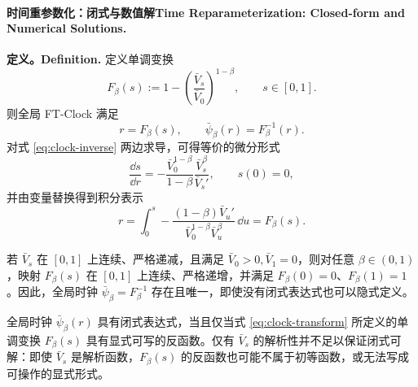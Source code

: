 \paragraph{\ifinternalcn 时间重参数化：闭式与数值解\else Time Reparameterization: Closed-form and Numerical Solutions\fi.}
\textbf{\ifinternalcn 定义。\else Definition.\fi}
定义单调变换
\begin{equation}
  F_{\beta}(s)
  :=
  1-\left(\frac{\bar{V}_s}{\bar{V}_0}\right)^{1-\beta},
  \qquad s \in [0,1].
  \label{eq:clock-transform}
\end{equation}
则全局 FT-Clock 满足
\begin{equation}
  r = F_{\beta}(s),
  \qquad
  \bar{\psi}_{\beta}(r) = F_{\beta}^{-1}(r).
  \label{eq:clock-inverse}
\end{equation}
对式 \eqref{eq:clock-inverse} 两边求导，可得等价的微分形式
\begin{equation}
  \frac{\dd s}{\dd r}
  =
  -\frac{\bar{V}_0^{1-\beta}}{1-\beta}
  \frac{\bar{V}_s^{\beta}}{\bar{V}_s'},
  \qquad s(0)=0,
  \label{eq:clock-ode}
\end{equation}
并由变量替换得到积分表示
\begin{equation}
  r
  =
  \int_0^s
  -\frac{(1-\beta)\bar{V}_u'}{\bar{V}_0^{1-\beta}\bar{V}_u^{\beta}}
  \,\dd u
  =
  F_{\beta}(s).
  \label{eq:clock-integral}
\end{equation}

\begin{proposition}[隐式时钟的存在性]
若 $\bar{V}_s$ 在 $[0,1]$ 上连续、严格递减，且满足 $\bar{V}_0>0,\bar{V}_1=0$，则对任意 $\beta \in (0,1)$，映射 $F_{\beta}(s)$ 在 $[0,1]$ 上连续、严格递增，并满足 $F_{\beta}(0)=0$、$F_{\beta}(1)=1$。因此，全局时钟 $\bar{\psi}_{\beta}=F_{\beta}^{-1}$ 存在且唯一，即使没有闭式表达式也可以隐式定义。
\end{proposition}

\begin{theorem}[闭式可解条件]
全局时钟 $\bar{\psi}_{\beta}(r)$ 具有闭式表达式，当且仅当式 \eqref{eq:clock-transform} 所定义的单调变换 $F_{\beta}(s)$ 具有显式可写的反函数。仅有 $\bar{V}_s$ 的解析性并不足以保证闭式可解：即使 $\bar{V}_s$ 是解析函数，$F_{\beta}(s)$ 的反函数也可能不属于初等函数，或无法写成可操作的显式形式。
\end{theorem}

